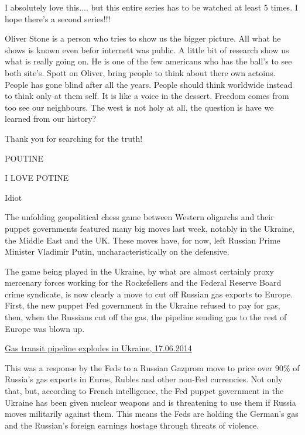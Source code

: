 \begin{itemize}

I absolutely love this.... but this entire series has to be watched at least 5
times. I hope there's a second series!!!


Oliver Stone is a person who tries to show us the bigger picture. All what he
shows is known even befor internett was public. A little bit of research show
us what is really going on. He is one of the few americans who has the ball's
to see both site's. Spott on Oliver, bring people to think about there own
actoins. People has gone blind after all the years. People should think
worldwide instead to think only at them self. It is like a voice in the
dessert. Freedom comes from too see our neighbours. The west is not holy at
all, the question is have we learned from our history?


Thank you for searching for the truth!

POUTINE

I LOVE POTINE

Idiot


The unfolding geopolitical chess game between Western oligarchs and their
puppet governments featured many big moves last week, notably in the Ukraine,
the Middle East and the UK. These moves have, for now, left Russian Prime
Minister Vladimir Putin, uncharacteristically on the defensive.

The game being played in the Ukraine, by what are almost certainly proxy
mercenary forces working for the Rockefellers and the Federal Reserve Board
crime syndicate, is now clearly a move to cut off Russian gas exports to
Europe. First, the new puppet Fed government in the Ukraine refused to pay for
gas, then, when the Russians cut off the gas, the pipeline sending gas to the
rest of Europe was blown up.

\href{http://rt.com/news/166532-gas-pipeline-blast-ukraine}{%
Gas transit pipeline explodes in Ukraine, 17.06.2014%
}

This was a response by the Feds to a Russian Gazprom move to price over 90\% of
Russia’s gas exports in Euros, Rubles and other non-Fed currencies. Not only
that, but, according to French intelligence, the Fed puppet government in the
Ukraine has been given nuclear weapons and is threatening to use them if Russia
moves militarily against them. This means the Feds are holding the German’s gas
and the Russian’s foreign earnings hostage through threats of violence.


\end{itemize}
